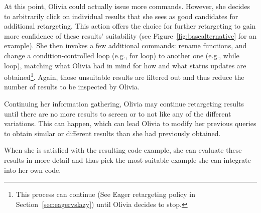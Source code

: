At this point, Olivia could actually issue more commands. However, she decides to arbitrarily click on individual results that she sees as good candidates for additional retargeting. This action offers the choice for further retargeting to gain more confidence of these results' suitability (see Figure~\ref{fig:basealternative} for an example). She then invokes a few additional commands: rename functions, and change a condition-controlled loop (e.g., for loop) to another one (e.g., while loop), matching what Olivia had in mind for how and what status updates are obtained\footnote{This process can continue (See Eager retargeting policy in Section~\ref{sec:eagervslazy}) until Olivia decides to stop.}. Again, those unsuitable results are filtered out and thus reduce the number of results to be inspected by Olivia.

Continuing her information gathering, Olivia may continue retargeting results until there are no more results to screen or to not like any of the different variations. This can happen, which can lead Olivia to modify her previous queries to obtain similar or different results than she had previously obtained.

When she is satisfied with the resulting code example, she can evaluate these results in more detail and thus pick the most suitable example she can integrate into her own code.

